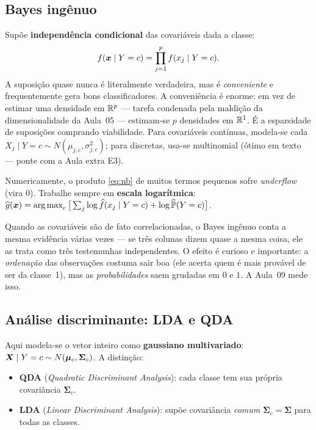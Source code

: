 \documentclass[11pt,a4paper]{article}
\begin{document}
\subsection{Bayes ingênuo}
Supõe \textbf{independência condicional} das covariáveis dada a classe:
\begin{equation}\label{eq:nb}
  f(\bm{x}\mid Y=c) = \prod_{j=1}^p f(x_j\mid Y=c).
\end{equation}
A suposição quase nunca é literalmente verdadeira, mas é \emph{conveniente} e
frequentemente gera bons classificadores. A conveniência é enorme: em vez de
estimar uma densidade em $\mathbb{R}^p$ --- tarefa condenada pela maldição da
dimensionalidade da Aula~05 --- estimam-se $p$ densidades em $\mathbb{R}^1$. É a
esparsidade de suposições comprando viabilidade. Para covariáveis contínuas,
modela-se cada $X_j\mid Y=c \sim N(\mu_{j,c},\sigma^2_{j,c})$; para discretas,
usa-se multinomial (ótimo em texto --- ponte com a Aula extra E3).

\begin{atencao}
Numericamente, o produto \eqref{eq:nb} de muitos termos pequenos sofre
\emph{underflow} (vira $0$). Trabalhe sempre em \textbf{escala logarítmica}:
$\ghat(\x)=\argmax_c\big[\sum_j \log \widehat f(x_j\mid Y=c)+\log\widehat\Prob(Y=c)\big]$.
\end{atencao}

\begin{atencao}
Quando as covariáveis são de fato correlacionadas, o Bayes ingênuo conta a mesma
evidência várias vezes --- se três colunas dizem quase a mesma coisa, ele as trata
como três testemunhas independentes. O efeito é curioso e importante: a
\emph{ordenação} das observações costuma sair boa (ele acerta quem é mais provável
de ser da classe~1), mas as \emph{probabilidades} saem grudadas em $0$ e $1$. A
Aula~09 mede isso.
\end{atencao}

\subsection{Análise discriminante: LDA e QDA}
Aqui modela-se o vetor inteiro como \textbf{gaussiano multivariado}:
$\bm{X}\mid Y=c \sim N(\bm{\mu}_c,\bm{\Sigma}_c)$. A distinção:
\begin{itemize}[leftmargin=1.4cm,nosep]
  \item \textbf{QDA} (\emph{Quadratic Discriminant Analysis}): cada classe tem sua
        própria covariância $\bm{\Sigma}_c$.
  \item \textbf{LDA} (\emph{Linear Discriminant Analysis}): supõe covariância
        \emph{comum} $\bm{\Sigma}_c=\bm{\Sigma}$ para todas as classes.
\end{itemize}
\end{document}
